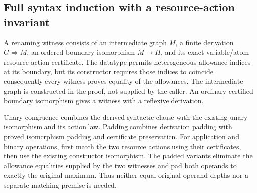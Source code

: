 








\subsection{Full syntax induction with a resource-action invariant}

A renaming witness consists of an intermediate graph $M$, a finite derivation
$G\Rightarrow M$, an ordered boundary isomorphism $M\to H$, and its exact
variable/atom resource-action certificate. The datatype permits heterogeneous
allowance indices at its boundary, but its constructor requires those indices to
coincide; consequently every witness proves equality of the allowances. The
intermediate graph is constructed in the proof, not supplied by the caller.
An ordinary certified boundary isomorphism gives a witness with a reflexive
derivation.




Unary congruence combines the derived syntactic clause with the existing
unary isomorphism and its action law. Padding combines derivation padding with
proved isomorphism padding and certificate preservation. For application and
binary operations, first match the two resource actions using their certificates,
then use the existing constructor isomorphism. The padded variants eliminate the
allowance equalities supplied by the two witnesses and pad both operands to
exactly the original maximum. Thus neither equal original operand depths nor a
separate matching premise is needed.

